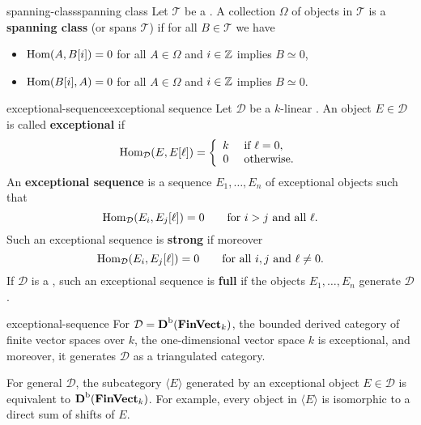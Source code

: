 \begin{topic}{spanning-class}{spanning class}
    Let $\mathcal{T}$ be a . A collection $\Omega$ of objects in $\mathcal{T}$ is a \textbf{spanning class} (or spans $\mathcal{T}$) if for all $B \in \mathcal{T}$ we have
    \begin{itemize}
        \item $\text{Hom}(A, B[i]) = 0$ for all $A \in \Omega$ and $i \in \mathbb{Z}$ implies $B \simeq 0$,
        \item $\text{Hom}(B[i], A) = 0$ for all $A \in \Omega$ and $i \in \mathbb{Z}$ implies $B \simeq 0$.
    \end{itemize}
\end{topic}

\begin{topic}{exceptional-sequence}{exceptional sequence}
    Let $\mathcal{D}$ be a $k$-linear . An object $E \in \mathcal{D}$ is called \textbf{exceptional} if
    \[ \text{Hom}_\mathcal{D}(E, E[\ell]) = \left\{\begin{array}{cl} k & \text{ if } \ell = 0, \\ 0 & \text{ otherwise.} \end{array}\right. \]
    An \textbf{exceptional sequence} is a sequence $E_1, \ldots, E_n$ of exceptional objects such that
    \[ \text{Hom}_\mathcal{D}(E_i, E_j[\ell]) = 0 \qquad \textup{for $i > j$ and all $\ell$}. \]
    Such an exceptional sequence is \textbf{strong} if moreover
    \[ \text{Hom}_\mathcal{D}(E_i, E_j[\ell]) = 0 \qquad \textup{for all $i, j$ and $\ell \ne 0$}. \]
    If $\mathcal{D}$ is a , such an exceptional sequence is \textbf{full} if the objects $E_1, \ldots, E_n$ generate $\mathcal{D}$.
\end{topic}


\begin{example}{exceptional-sequence}
    For $\mathcal{D} = \textbf{D}^\textup{b}(\textbf{FinVect}_k)$, the bounded derived category of finite vector spaces over $k$, the one-dimensional vector space $k$ is exceptional, and moreover, it generates $\mathcal{D}$ as a triangulated category.

    For general $\mathcal{D}$, the subcategory $\langle E \rangle$ generated by an exceptional object $E \in \mathcal{D}$ is equivalent to $\textbf{D}^\textup{b}(\textbf{FinVect}_k)$. For example, every object in $\langle E \rangle$ is isomorphic to a direct sum of shifts of $E$.
\end{example}


